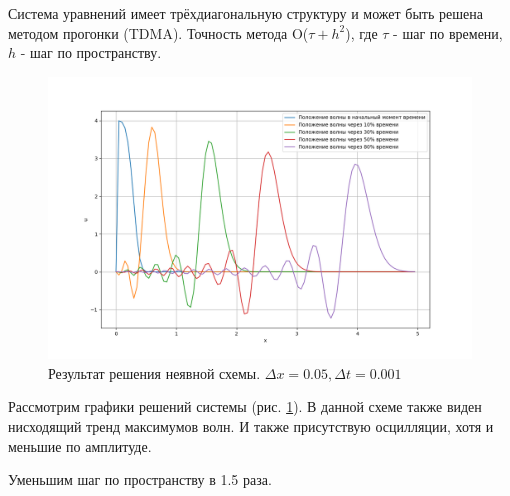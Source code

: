Система уравнений имеет трёхдиагональную структуру и может быть решена методом прогонки (TDMA).
Точность метода O($\tau + h^2$), где $\tau$ - шаг по времени, $h$ - шаг по пространству.
\newline
\begin{figure}[h]  %
	\centering
	\includegraphics[height=0.7\textwidth]{imgs/implicit.png}  %
	\caption{Результат решения неявной схемы. $\Delta x = 0.05 , \Delta t = 0.001$}  %
	\label{fig:implicit}  %
\end{figure}
 
Рассмотрим графики решений системы (рис. \ref{fig:implicit}). В данной схеме также виден нисходящий тренд максимумов волн. И также присутствую осцилляции, хотя и меньшие по амплитуде.

\newpage
Уменьшим шаг по пространству в 1.5 раза. 

